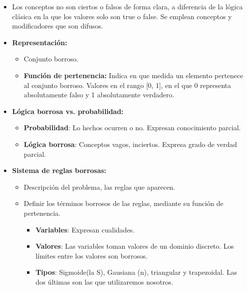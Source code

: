 \documentclass[12pt, twoside, openright]{report} %
\begin{document}
  \begin{itemize}
  \item Los conceptos no son ciertos o falsos de forma clara, a diferencia
    de la lógica clásica en la que los valores solo son true o false. Se
    emplean conceptos y modificadores que son difusos.
    
  \item \textbf{Representación:}
    

    \begin{itemize}
    \item Conjunto borroso.
      
    \item \textbf{Función de pertenencia:} Indica en que medida un elemento
      pertenece al conjunto borroso. Valores en el rango {[}0, 1{]}, en
      el que 0 representa absolutamente falso y 1 absolutamente
      verdadero.
      
    \end{itemize}
  \item \textbf{Lógica borrosa vs. probabilidad:}
    

    \begin{itemize}
    \item \textbf{Probabilidad}: Lo hechos ocurren o no. Expresan
      conocimiento parcial.
      
    \item \textbf{Lógica borrosa}: Conceptos vagos, inciertos. Expresa grado
      de verdad parcial.
      
    \end{itemize}
  \item \textbf{Sistema de reglas borrosas:}
    

    \begin{itemize}
    \item Descripción del problema, las reglas que aparecen.
      
    \item Definir los términos borrosos de las reglas, mediante su función
      de pertenencia.
      

      \begin{itemize}
      \item \textbf{Variables}: Expresan cualidades.
        
      \item \textbf{Valores}: Las variables toman valores de un dominio
        discreto. Los límites entre los valores son borrosos.
        
      \item \textbf{Tipos}: Sigmoide(la S), Gausiana (n), triangular y
        trapezoidal. Las dos últimas son las que utilizaremos nosotros.
        

\end{itemize}
\end{itemize}
\end{itemize}
\end{document}
